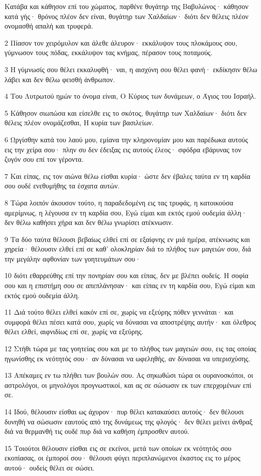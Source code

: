 \par Κατάβα και κάθησον επί του χώματος, παρθένε θυγάτηρ της Βαβυλώνος· κάθησον κατά γής· θρόνος πλέον δεν είναι, θυγάτηρ των Χαλδαίων· διότι δεν θέλεις πλέον ονομασθή απαλή και τρυφερά.
\par 2 Πίασον τον χειρόμυλον και άλεθε άλευρον· εκκάλυψον τους πλοκάμους σου, γύμνωσον τους πόδας, εκκάλυψον τας κνήμας, πέρασον τους ποταμούς.
\par 3 Η γύμνωσίς σου θέλει εκκαλυφθή· ναι, η αισχύνη σου θέλει φανή· εκδίκησιν θέλω λάβει και δεν θέλω φεισθή άνθρωπον.
\par 4 Του Λυτρωτού ημών το όνομα είναι, Ο Κύριος των δυνάμεων, ο Άγιος του Ισραήλ.
\par 5 Κάθησον σιωπώσα και είσελθε εις το σκότος, θυγάτηρ των Χαλδαίων· διότι δεν θέλεις πλέον ονομάζεσθαι, Η κυρία των βασιλείων.
\par 6 Ωργίσθην κατά του λαού μου, εμίανα την κληρονομίαν μου και παρέδωκα αυτούς εις την χείρα σου· πλην συ δεν έδειξας εις αυτούς έλεος· σφόδρα εβάρυνας τον ζυγόν σου επί τον γέροντα.
\par 7 Και είπας, εις τον αιώνα θέλω είσθαι κυρία· ώστε δεν έβαλες ταύτα εν τη καρδία σου ουδέ ενεθυμήθης τα έσχατα αυτών.
\par 8 Τώρα λοιπόν άκουσον τούτο, η παραδεδομένη εις τας τρυφάς, η κατοικούσα αμερίμνως, η λέγουσα εν τη καρδία σου, Εγώ είμαι και εκτός εμού ουδεμία άλλη· δεν θέλω καθήσει χήρα και δεν θέλω γνωρίσει ατέκνωσιν.
\par 9 Τα δύο ταύτα θέλουσι βεβαίως ελθεί επί σε εξαίφνης εν μιά ημέρα, ατέκνωσις και χηρεία· θέλουσιν ελθεί επί σε καθ' ολοκληρίαν διά το πλήθος των μαγειών σου, διά την μεγάλην αφθονίαν των γοητευμάτων σου·
\par 10 διότι εθαρρεύθης επί την πονηρίαν σου και είπας, δεν με βλέπει ουδείς. Η σοφία σου και η επιστήμη σου σε απεπλάνησαν· και είπας εν τη καρδία σου, Εγώ είμαι και εκτός εμού ουδεμία άλλη.
\par 11 Διά τούτο θέλει ελθεί κακόν επί σε, χωρίς να εξεύρης πόθεν γεννάται· και συμφορά θέλει πέσει κατά σου, χωρίς να δύνασαι να αποστρέψης αυτήν· και όλεθρος θέλει ελθεί, αιφνιδίως επί σε, χωρίς να εξεύρης.
\par 12 Στήθι τώρα με τας γοητείας σου και με το πλήθος των μαγειών σου, εις τας οποίας ηγωνίσθης εκ νεότητός σου· αν δύνασαι να ωφεληθής, αν δύνασαι να υπερισχύσης.
\par 13 Απέκαμες εν τω πλήθει των βουλών σου. Ας σηκωθώσι τώρα οι ουρανοσκόποι, οι αστρολόγοι, οι μηνολόγοι προγνωστικοί, και ας σε σώσωσιν εκ των επερχομένων επί σε.
\par 14 Ιδού, θέλουσιν είσθαι ως άχυρον· πυρ θέλει κατακαύσει αυτούς· δεν θέλουσι δυνηθή να σώσωσιν εαυτούς από της δυνάμεως της φλογός· δεν θέλει μείνει άνθραξ διά να θερμανθή τις ουδέ πυρ διά να καθήση έμπροσθεν αυτού.
\par 15 Τοιούτοι θέλουσιν είσθαι εις σε εκείνοι, μετά των οποίων εκ νεότητός σου εκοπίασας, οι έμποροί σου· θέλουσι φύγει περιπλανώμενοι έκαστος εις το μέρος αυτού· ουδείς θέλει σε σώσει.

